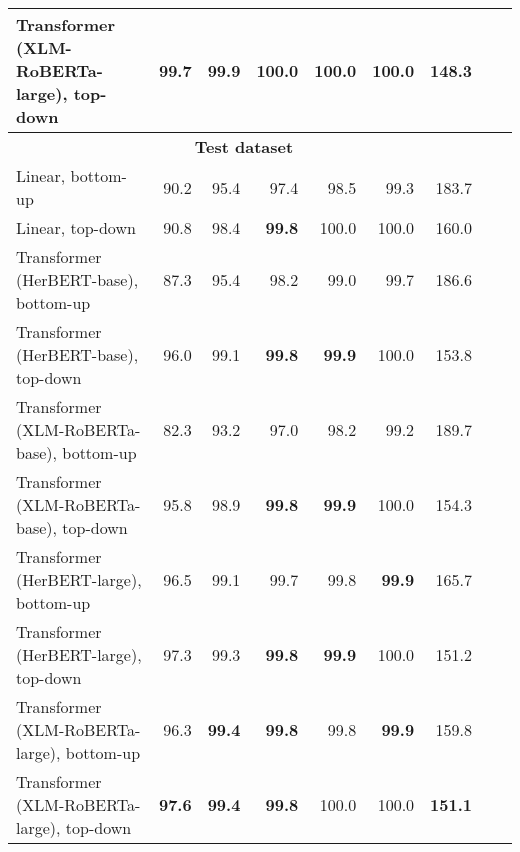 \begin{table}[ht!]
{\begin{tabular}{lrrrrrrrr}
  Transformer (XLM-RoBERTa-large), top-down & \textbf{99.7} & \textbf{99.9} & 100.0 & 100.0 & 100.0 & \textbf{148.3} \\ 
   \hline \multicolumn{7}{c}{\textbf{Test dataset}} \\ \hline
Linear, bottom-up & 90.2 & 95.4 & 97.4 & 98.5 & 99.3 & 183.7 \\ 
  Linear, top-down & 90.8 & 98.4 & \textbf{99.8} & 100.0 & 100.0 & 160.0 \\ 
  Transformer (HerBERT-base), bottom-up & 87.3 & 95.4 & 98.2 & 99.0 & 99.7 & 186.6 \\ 
  Transformer (HerBERT-base), top-down & 96.0 & 99.1 & \textbf{99.8} & \textbf{99.9} & 100.0 & 153.8 \\ 
  Transformer (XLM-RoBERTa-base), bottom-up & 82.3 & 93.2 & 97.0 & 98.2 & 99.2 & 189.7 \\ 
  Transformer (XLM-RoBERTa-base), top-down & 95.8 & 98.9 & \textbf{99.8} & \textbf{99.9} & 100.0 & 154.3 \\ 
  Transformer (HerBERT-large), bottom-up & 96.5 & 99.1 & 99.7 & 99.8 & \textbf{99.9} & 165.7 \\ 
  Transformer (HerBERT-large), top-down & 97.3 & 99.3 & \textbf{99.8} & \textbf{99.9} & 100.0 & 151.2 \\ 
  Transformer (XLM-RoBERTa-large), bottom-up & 96.3 & \textbf{99.4} & \textbf{99.8} & 99.8 & \textbf{99.9} & 159.8 \\ 
  Transformer (XLM-RoBERTa-large), top-down & \textbf{97.6} & \textbf{99.4} & \textbf{99.8} & 100.0 & 100.0 & \textbf{151.1} \\ 
   \hline
\end{tabular}
}
\end{table}




